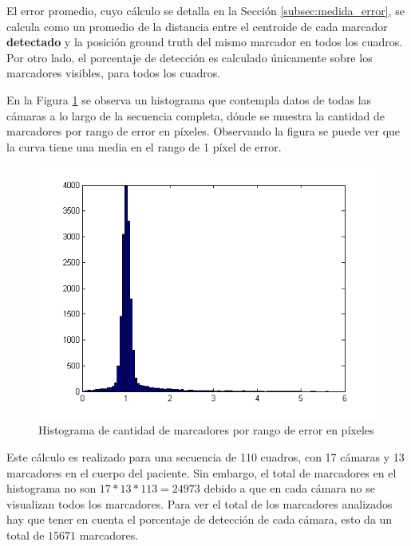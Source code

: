 El error promedio, cuyo cálculo se detalla en la Sección \ref{subsec:medida_error}, se calcula como un promedio de la distancia entre el centroide de cada marcador \textbf{detectado} y la posición ground truth del mismo marcador en todos los cuadros. Por otro lado, el porcentaje de detección es calculado únicamente sobre los marcadores visibles, para todos los cuadros.

En la Figura \ref{histerr} se observa un histograma que contempla datos de todas las cámaras a lo largo de la secuencia completa, dónde se muestra la cantidad de marcadores por rango de error en píxeles. Observando la figura se puede ver que la curva tiene una media en el rango de 1 píxel de error.  

\begin{figure}[H]
\begin{center}
\includegraphics[scale=0.6]{img/Histo_Error.png}
\end{center}
\vspace{-1cm}
\caption{Histograma de cantidad de marcadores por rango de error en píxeles}
\label{histerr}
\end{figure}

Este cálculo es realizado para una secuencia de 110 cuadros, con 17 cámaras y 13 marcadores en el cuerpo del paciente. Sin embargo, el total de marcadores en el histograma no son $17*13*113 = 24973$ debido a que en cada cámara no se visualizan todos los marcadores. Para ver el total de los marcadores analizados hay que tener en cuenta el porcentaje de detección de cada cámara, esto da un total de $15671$ marcadores.

